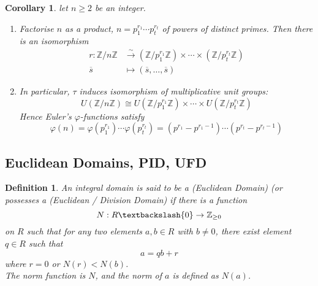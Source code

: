 \documentclass[a4paper,8pt]{article}
\newcommand{\Z}{\mathbb{Z}}
\newcommand{\isomorp}{\xrightarrow{\sim}}
\newcommand{\hlt}[1]{\textit{{\color{blue}#1}}}
\theoremstyle{theorem}
\newtheorem{corollary}[theorem]{Corollary}
\newtheorem{definition}[theorem]{Definition}
\begin{document}
\begin{corollary}
let $n \geq 2$ be an integer.
\begin{enumerate}[label=(\roman*)]
\item Factorise $n$ as a product, $n = p_1^{r_1} \cdots p_t^{r_t}$ of powers of distinct primes. Then there is an isomorphism
\begin{align}
r: \Z /n\Z  &\isomorp (\Z/p_1^{r_1}\Z) \times \cdots \times (\Z/p_t^{r_t}\Z) \nonumber\\
\overline{s} &\mapsto (\overline{s}, \ldots, \overline{s}) \nonumber
\end{align}
\item In particular, $\tau$ induces isomorphism of multiplicative unit groups:
\begin{equation}
	U(\Z/n\Z) \cong U(\Z/p_1^{r_1}\Z) \times \cdots \times U(\Z/p_t^{r_t}\Z) \nonumber
\end{equation}
Hence Euler's $\varphi$-functions satisfy
\begin{equation}
	\varphi(n) = \varphi(p_1^{r_1}) \cdots \varphi(p_t^{r_t}) = (p^{r_1} - p^{r_1 -1}) \cdots (p^{r_t} - p^{r_t -1}) \nonumber
\end{equation}
\end{enumerate}
\end{corollary}

\subsection{Euclidean Domains, PID, UFD}

\begin{definition}
An integral domain is said to be a \hlt{(Euclidean Domain)} (or possesses a \hlt{(Euclidean / Division Domain}) if there is a function
\begin{equation}
	N:R \textbackslash \{0\} \rightarrow \Z_{\geq 0} \nonumber
\end{equation}
on $R$ such that for any two elements $a, b \in R$ with $b \neq 0$, there exist element $q \in R$ such that
\begin{equation}
	a=qb+r \nonumber
\end{equation}
where $r=0$ or $N(r)<N(b)$.\\
The \hlt{norm function} is $N$, and the \hlt{norm of $a$} is defined as $N(a)$.
\end{definition}
\end{document}
